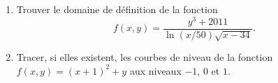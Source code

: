 \begin{exercice}\label{exoGeomAnal-0016}

  \begin{enumerate}
  \item Trouver le domaine de définition de la fonction 
    \begin{equation}
      f(x,y)=\frac{y^3+2011}{\ln (x/50)\sqrt{x-34}}.
    \end{equation}
  \item Tracer, si elles existent, les courbes de niveau de la fonction $\displaystyle f(x,y)= (x+1)^2+ y$ aux niveaux $-1$, $0$ et $1$.  
  \end{enumerate} 

\end{exercice}
